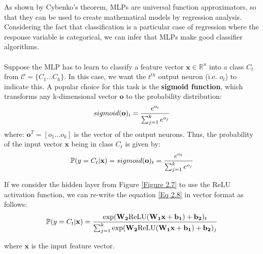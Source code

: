 	As shown by Cybenko's theorem, MLPs are universal function approximators, so that they can be used to create mathematical models by regression analysis. Considering the fact that classification is a particular case of regression where the response variable is categorical, we can infer that MLPs make good classifier algorithms. 
	\\ \\
	Suppose the MLP has to learn to classify a feature vector $\mathbf{x} \in \mathbb{R}^n$ into a class $C_t$ from $\mathcal{C} = \{C_1\dots C_k\}$. In this case, we want the $t^{th}$ output neuron (i.e. $o_t$) to indicate this. A popular choice for this task is the \textbf{sigmoid function}, which transforms any k-dimensional vector $\mathbf{o}$ to the probability distribution:
	\begin{equation}
		\centering
		sigmoid(\mathbf{o})_i = \frac{e^{o_i}}{\sum_{j=1}^{k}e^{o_j}}
	\end{equation}
	where: $\mathbf{o}^T = [o_1\dots o_k]$ is the vector of the output neurons. Thus, the probability of the input vector $\mathbf{x}$ being in class $C_t$ is given by:
	\begin{equation}
		\centering
		\mathbb{P}(y = C_t | \mathbf{x}) = sigmoid(\mathbf{o})_t = \frac{e^{o_t}}{\sum_{j=1}^{k}e^{o_j}}
		\label{Eq 2.8}
	\end{equation} 
	
	If we consider the hidden layer from Figure \ref{Figure 2.7} to use the ReLU activation function, we can re-write the equation \ref{Eq 2.8} in vector format as follows: 
	\begin{equation}
		\centering
		\mathbb{P}(y=C_t | \mathbf{x}) = \frac
		{
			\exp (\mathbf{W_2}\text{ReLU}(\mathbf{W_1 x} + \mathbf{b_1}) + \mathbf{b_2})_t
		}
		{
			{\sum_{j=1}^{k}\exp (\mathbf{W_2}\text{ReLU}(\mathbf{W_1 x} + \mathbf{b_1}) + \mathbf{b_2})_j}
		} 
	\end{equation}
	
	where $\mathbf{x}$ is the input feature vector.
	
